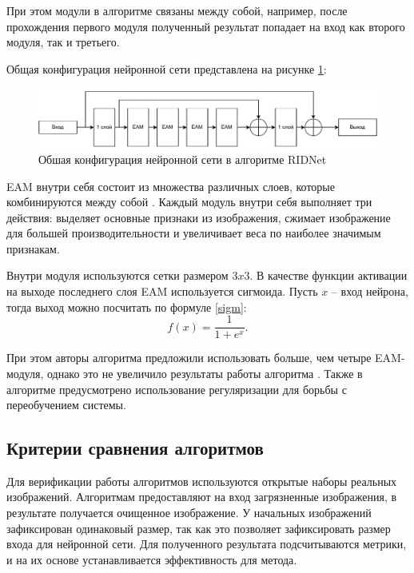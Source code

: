 При этом модули в алгоритме связаны между собой, например, после прохождения первого модуля полученный результат попадает на вход как второго модуля, так и третьего.

Общая конфигурация нейронной сети представлена на рисунке \ref{fig::ridnetall}:
\FloatBarrier
\begin{figure}[h]	
	\begin{center}
		\includegraphics[width=\linewidth]{inc/pdf/ridnet.pdf}
	\end{center}
	\captionsetup{justification=centering}
	\caption{Обшая конфигурация нейронной сети в алгоритме RIDNet}
	\label{fig::ridnetall}
\end{figure}
\FloatBarrier

EAM внутри себя состоит из множества различных слоев, которые комбинируются между собой \cite{ridnet}.
Каждый модуль внутри себя выполняет три действия: выделяет основные признаки из изображения, сжимает изображение для большей производительности и увеличивает веса по наиболее значимым признакам.

Внутри модуля используются сетки размером $3x3$. 
В качестве функции активации на выходе последнего слоя EAM используется сигмоида. 
Пусть $x$ -- вход нейрона, тогда выход можно посчитать по формуле \ref{sigm}:
\begin{equation}
	\label{sigm}
	f(x) = \frac{1}{1+e^x}.
\end{equation}

При этом авторы алгоритма предложили использовать больше, чем четыре EAM-модуля, однако это не увеличило результаты работы алгоритма \cite{ridnet2}.
Также в алгоритме предусмотрено использование регуляризации для борьбы с переобучением системы.

\subsection{Критерии сравнения алгоритмов}
Для верификации работы алгоритмов используются открытые наборы реальных изображений. 
Алгоритмам предоставляют на вход загрязненные изображения, в результате получается очищенное изображение.
У начальных изображений зафиксирован одинаковый размер, так как это позволяет зафиксировать размер входа для нейронной сети.
Для полученного результата подсчитываются метрики, и на их основе устанавливается эффективность для метода.

